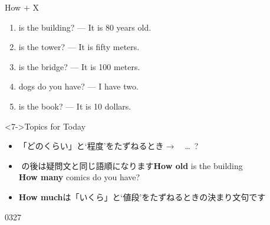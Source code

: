 \documentclass[aspectratio=169,xcolor={dvipsnames,table}]{beamer}
\begin{document}
\begin{frame}[plain]{How $+$ X}
 \begin{enumerate}
  \item {} is the building? --- It is 80 years old.%
\hfill{}
  \item {} is the tower? --- It is fifty meters.%
\hfill{}
  \item {} is the bridge? --- It is 100 meters.
\hfill{}
  \item {} dogs do you have? --- I have two.
\hfill{}
  \item {} is the book? --- It is 10 dollars.
\hfill{}
 \end{enumerate}

\begin{block}<7->{Topics for Today}\small
\pause
\begin{itemize}[square]\small
 \item 「どのくらい」と`程度'をたずねるとき$\longrightarrow$\,\,\,\,\,\,\ldots{}\,\,\,?
 \item {}\,\,の後は疑問文と同じ語順になります\hfill{\bfseries How old} is the building\\
\hfill{}{\bfseries How many} comics do you have?
 \item   {\bfseries How much}は「いくら」と`値段'をたずねるときの決まり文句です
\end{itemize}
     \end{block}


\hfill{\tiny 0327}\,{\scriptsize{}}

\end{frame}
\end{document}
